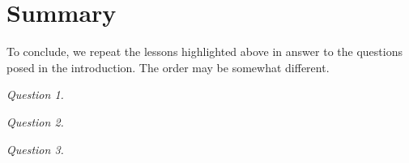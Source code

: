 \documentclass[graybox,footinfo]{svmult}
\begin{document}
\begin{FJHLesson}
	\FJHLessonEleven
\end{FJHLesson}


\section{Summary}
To conclude, we repeat the lessons highlighted above in answer to the questions posed 
in the 
introduction.  The order may be somewhat different.

\FJHLessonZero \FJHLessonSix  \FJHLessonTwoHalf \FJHLessonFourteen \FJHLessonSeven 
\FJHLessonNine



\begin{list}{}{\setlength\leftmargin{4.2ex}\setlength{}}
	\item[\emph{Question 1.}] \emph{\FJHQOne}
	
	\FJHLessonOne \FJHLessonTwo \FJHLessonThree   \FJHLessonFive
	
	\item[\emph{Question 2.}] \emph{\FJHQTwo}
	
	\FJHLessonFour 	\FJHLessonEight \FJHLessonTwelve 	\FJHLessonThirteen
	
	\item[\emph{Question 3.}] \emph{\FJHQThree}
	
	\FJHLessonTen \FJHLessonEleven
	
	
\end{list}




\end{document}
